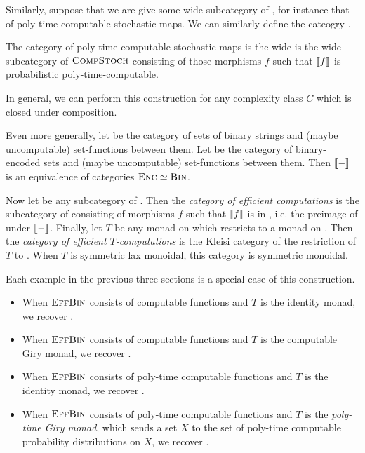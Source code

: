 Similarly, suppose that we are give some wide subcategory of
, for instance that of poly-time computable stochastic maps.
We can similarly define the cateogry .

\begin{dfn}
  The category  of poly-time computable stochastic maps is the wide is
  the wide subcategory of ${\textsc{\text{CompStoch}}}$ consisting of those morphisms $f$
  such that $\llbracket f \rrbracket$ is probabilistic poly-time-computable.
\end{dfn}

In general, we can perform this construction for any complexity class $C$ which
is closed under composition.

Even more generally, let  be the category of sets of binary strings and
(maybe uncomputable) set-functions between them. Let  be the category
of binary-encoded sets and (maybe uncomputable) set-functions between them. Then
$\llbracket - \rrbracket$ is an equivalence of categories ${\textsc{\text{Enc}}}\simeq {\textsc{\text{Bin}}}$.

Now let  be any subcategory of . Then the \emph{category
of efficient computations}  is the subcategory of 
consisting of morphisms $f$ such that $\llbracket f \rrbracket$ is in , i.e. the
preimage of  under $\llbracket - \rrbracket$. Finally, let $T$ be any monad on
 which restricts to a monad on . Then the \emph{category of
efficient $T$-computations} is the Kleisi category of the restriction of $T$ to
. When $T$ is symmetric lax monoidal, this category is symmetric
monoidal.

\begin{ex}
  Each example in the previous three sections is a special case of this
  construction.
  \begin{itemize}
    \item When ${\textsc{\text{EffBin}}}$ consists of computable functions and $T$ is the identity
      monad, we recover .
    \item When ${\textsc{\text{EffBin}}}$ consists of computable functions and $T$ is the
      computable Giry monad, we recover .
    \item When ${\textsc{\text{EffBin}}}$ consists of poly-time computable functions and $T$
      is the identity monad, we recover .
    \item When ${\textsc{\text{EffBin}}}$ consists of poly-time computable functions and $T$
      is the \emph{poly-time Giry monad}, which sends a set $X$ to the set of
      poly-time computable probability distributions on $X$, we recover
      .
  \end{itemize}
\end{ex}

